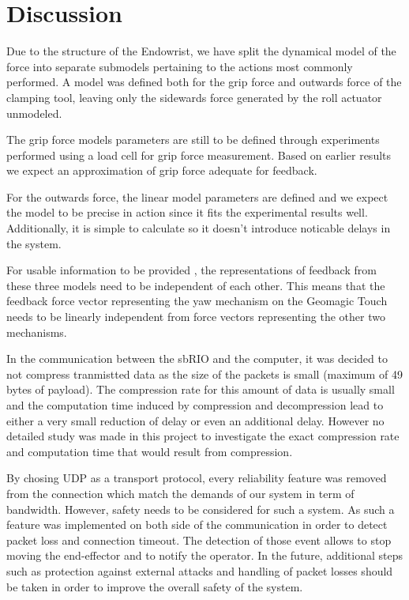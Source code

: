 \section{Discussion}
Due to the structure of the Endowrist, we have split the dynamical model of the force into separate submodels pertaining to the actions most commonly performed.
A model was defined both for the grip force and outwards force of the clamping tool, leaving only the sidewards force generated by the roll actuator unmodeled.

The grip force models parameters are still to be defined through experiments performed using a load cell for grip force measurement.
Based on earlier results \cite{kim2014dynamic} we expect an approximation of grip force adequate for feedback.

For the outwards force, the linear model parameters are defined and we expect the model to be precise in action since it fits the experimental results well.
Additionally, it is simple to calculate so it doesn't introduce noticable delays in the system.

For usable information to be provided , the representations of feedback from these three models need to be independent of each other.
This means that the feedback force vector representing the yaw mechanism on the Geomagic Touch needs to be linearly independent from force vectors representing the other two mechanisms.


In the communication between the sbRIO and the computer, it was decided to not compress tranmistted data as the size of the packets is small (maximum of 49 bytes of payload). The compression rate for this amount of data is usually small and the computation time induced by compression and decompression lead to either a very small reduction of delay or even an additional delay. However no detailed study was made in this project to investigate the exact compression rate and computation time that would result from compression.

By chosing UDP as a transport protocol, every reliability feature was removed from the connection which match the demands of our system in term of bandwidth. However, safety needs to be considered for such a system. As such a feature was implemented on both side of the communication in order to detect packet loss and connection timeout. The detection of those event allows to stop moving the end-effector and to notify the operator. In the future, additional steps such as protection against external attacks and handling of packet losses should be taken in order to improve the overall safety of the system.